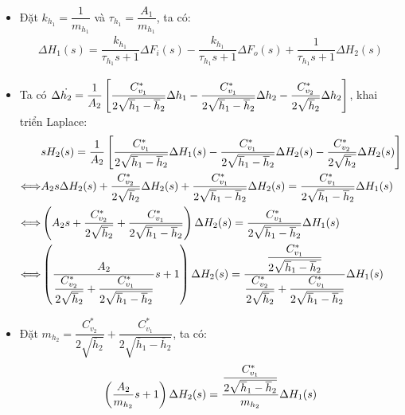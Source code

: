 \begin{itemize}
\begin{align*}
            \end{align*}
        \item Đặt $k_{h_1} = \dfrac{1}{m_{h_1}}$ và $\tau_{h_1} = \dfrac{A_1}{m_{h_1}}$, ta có:
            \begin{align*}
                \Delta H_1(s) = \dfrac{k_{h_1}}{\tau_{h_1} s + 1} \Delta F_i(s) - \dfrac{k_{h_1}}{\tau_{h_1} s + 1} \Delta F_o (s) + \dfrac{1}{\tau_{h_1} s + 1}\Delta H_2(s)
            \end{align*}
        \item Ta có $\Delta \dot{h_2} = \dfrac{1}{A_2} \left[{\dfrac{C_{v_1}^{*}}{2\sqrt{\overline{h}_1 - \overline{h}_2}} \Delta h_1 - \dfrac{C_{v_1}^{*}}{2\sqrt{\overline{h}_1 - \overline{h}_2}} \Delta h_2 - \dfrac{C_{v_2}^{*}}{2\sqrt{\overline{h}_2}} \Delta h_2}\right]$, khai triển Laplace:
            \begin{align*}
                & s H_2(s) = \dfrac{1}{A_2} \left[{\dfrac{C_{v_1}^{*}}{2\sqrt{\overline{h}_1 - \overline{h}_2}} \Delta H_1(s) - \dfrac{C_{v_1}^{*}}{2\sqrt{\overline{h}_1 - \overline{h}_2}} \Delta H_2(s) - \dfrac{C_{v_2}^{*}}{2\sqrt{\overline{h}_2}} \Delta H_2(s)}\right]\\
                \Longleftrightarrow & A_2 s \Delta H_2(s) + \dfrac{C_{v_2}^{*}}{2\sqrt{\overline{h}_2}} \Delta H_2(s) + \dfrac{C_{v_1}^{*}}{2\sqrt{\overline{h}_1 - \overline{h}_2}} \Delta H_2(s)= \dfrac{C_{v_1}^{*}}{2\sqrt{\overline{h}_1 - \overline{h}_2}} \Delta H_1(s) \\
                \Longleftrightarrow & \left({A_2 s + \dfrac{C_{v_2}^{*}}{2\sqrt{\overline{h}_2}} + \dfrac{C_{v_1}^{*}}{2\sqrt{\overline{h}_1 - \overline{h}_2}}}\right) \Delta H_2(s)= \dfrac{C_{v_1}^{*}}{2\sqrt{\overline{h}_1 - \overline{h}_2}} \Delta H_1(s) \\
                \Longleftrightarrow & \left({\dfrac{A_2}{\dfrac{C_{v_2}^{*}}{2\sqrt{\overline{h}_2}} + \dfrac{C_{v_1}^{*}}{2\sqrt{\overline{h}_1 - \overline{h}_2}}}s + 1}\right) \Delta H_2(s)= \dfrac{\dfrac{C_{v_1}^{*}}{2\sqrt{\overline{h}_1 - \overline{h}_2}}}{\dfrac{C_{v_2}^{*}}{2\sqrt{\overline{h}_2}} + \dfrac{C_{v_1}^{*}}{2\sqrt{\overline{h}_1 - \overline{h}_2}}} \Delta H_1(s)
            \end{align*}
        \item Đặt $m_{h_2} = \dfrac{C_{v_2}^{*}}{2\sqrt{\overline{h}_2}} + \dfrac{C_{v_1}^{*}}{2\sqrt{\overline{h}_1 - \overline{h}_2}}$, ta có:
            \begin{align*}
                \pfm{\dfrac{A_2}{m_{h_2}}s + 1} \Delta H_2(s)= \dfrac{\dfrac{C_{v_1}^{*}}{2\sqrt{\overline{h}_1 - \overline{h}_2}}}{m_{h_2}} \Delta H_1(s)

\end{align*}
\end{itemize}
